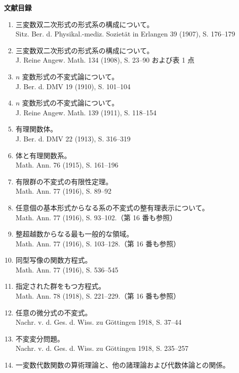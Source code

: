 \clearpage
\clearpage
\begin{center}
{\Large\bfseries 文献目録}
\end{center}
\label{bibliographie}

\begin{enumerate}
\setlength{\itemsep}{0.35em}
\item 三変数双二次形式の形式系の構成について。\\
Sitz. Ber. d. Physikal.-mediz. Sozietät in Erlangen 39 (1907), S. 176--179
\item 三変数双二次形式の形式系の構成について。\\
J. Reine Angew. Math. 134 (1908), S. 23--90 および表 1 点
\item \(n\) 変数形式の不変式論について。\\
J. Ber. d. DMV 19 (1910), S. 101--104
\item \(n\) 変数形式の不変式論について。\\
J. Reine Angew. Math. 139 (1911), S. 118--154
\item 有理関数体。\\
J. Ber. d. DMV 22 (1913), S. 316--319
\item 体と有理関数系。\\
Math. Ann. 76 (1915), S. 161--196
\item 有限群の不変式の有限性定理。\\
Math. Ann. 77 (1916), S. 89--92
\item 任意個の基本形式からなる系の不変式の整有理表示について。\\
Math. Ann. 77 (1916), S. 93--102.（第 16 番も参照）
\item 整超越数からなる最も一般的な領域。\\
Math. Ann. 77 (1916), S. 103--128.（第 16 番も参照）
\item 同型写像の関数方程式。\\
Math. Ann. 77 (1916), S. 536--545
\item 指定された群をもつ方程式。\\
Math. Ann. 78 (1918), S. 221--229.（第 16 番も参照）
\item 任意の微分式の不変式。\\
Nachr. v. d. Ges. d. Wiss. zu Göttingen 1918, S. 37--44
\item 不変変分問題。\\
Nachr. v. d. Ges. d. Wiss. zu Göttingen 1918, S. 235--257
\item 一変数代数関数の算術理論と、他の諸理論および代数体論との関係。\\

\end{enumerate}

